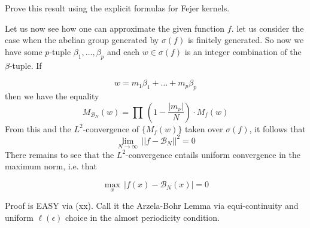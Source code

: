 \documentclass{amsart}
\def\uuu{_}
\def\vvv{-}
\begin{document}
 Prove this result using 
the explicit formulas for Fejer kernels.
\bigskip


\noindent
Let us now see how one can approximate the given function $f$.
let us consider the case when the abelian group
generated by $\sigma(f)$ is finitely generated.
So now we have some $p$\vvv tuple $\beta\uuu 1,\ldots,\beta\uuu p$
and each $w\in \sigma(f)$ is an integer combination
of the $\beta$\vvv tuple.
If

\[ 
w= m\uuu 1\beta\uuu 1+\ldots+m\uuu p\beta\uuu p
\]
then we have the equality
\[
M\uuu {\mathcal B\uuu N}(w)=
\prod\,(1\vvv \frac{|m\uuu \nu|}{N})\cdot M\uuu f(w)
\]
From this and the $L^2$\vvv convergence of $\{ M\uuu f(w)\}$
taken over $\sigma(f)$, it follows that
\[
\lim\uuu{N\to \infty}\, || f\vvv \mathcal B\uuu N||^2=0
\]
There remains to see that the $L^2$\vvv convergence entails 
uniform convergence in the maximum norm, i.e. that

\[ 
\max\uuu x\, |f(x)\vvv \mathcal B\uuu N(x)|=0
\]

\bigskip

Proof is EASY via (xx). Call it the Arzela\vvv Bohr Lemma via equi\vvv continuity
and uniform
$\ell(\epsilon)$ choice in the almost periodicity condition.


































 
\end{document}
